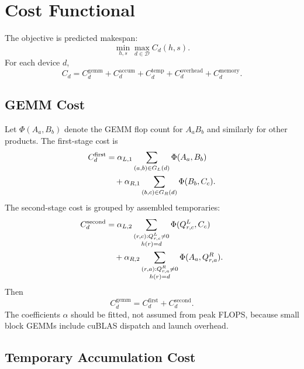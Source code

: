 \documentclass[11pt]{article}
\begin{document}
\section{Cost Functional}

The objective is predicted makespan:
\begin{equation}
  \min_{h,s} \max_{d\in\mathcal{D}} C_d(h,s).
\end{equation}
For each device $d$,
\begin{equation}
  C_d =
    C^{\mathrm{gemm}}_d
  + C^{\mathrm{accum}}_d
  + C^{\mathrm{temp}}_d
  + C^{\mathrm{overhead}}_d
  + C^{\mathrm{memory}}_d.
\end{equation}

\subsection{GEMM Cost}

Let $\Phi(A_a,B_b)$ denote the GEMM flop count for $A_aB_b$ and similarly for
other products.  The first-stage cost is
\begin{align}
  C^{\mathrm{first}}_d &=
    \alpha_{L,1}
      \sum_{(a,b)\in G_L(d)}
        \Phi(A_a,B_b) \notag\\
  &\quad+
    \alpha_{R,1}
      \sum_{(b,c)\in G_R(d)}
        \Phi(B_b,C_c).
\end{align}
The second-stage cost is grouped by assembled temporaries:
\begin{align}
  C^{\mathrm{second}}_d &=
    \alpha_{L,2}
      \sum_{\substack{(r,c): Q^L_{r,c}\ne 0\\h(r)=d}}
        \Phi(Q^L_{r,c},C_c) \notag\\
  &\quad+
    \alpha_{R,2}
      \sum_{\substack{(r,a): Q^R_{r,a}\ne 0\\h(r)=d}}
        \Phi(A_a,Q^R_{r,a}).
\end{align}
Then
\begin{equation}
  C^{\mathrm{gemm}}_d =
    C^{\mathrm{first}}_d + C^{\mathrm{second}}_d .
\end{equation}
The coefficients $\alpha$ should be fitted, not assumed from peak FLOPS, because
small block GEMMs include cuBLAS dispatch and launch overhead.

\subsection{Temporary Accumulation Cost}
\end{document}
